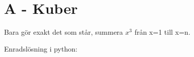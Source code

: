 \section*{A - Kuber}
Bara gör exakt det som står, summera $x^3$ från x=1 till x=n.

Enradslösning i python:
